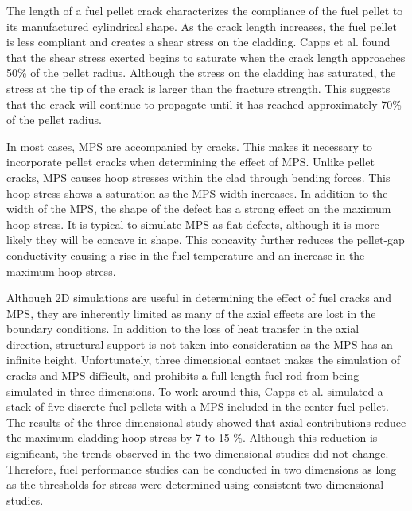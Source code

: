 \documentclass[edeposit,fullpage,11pt]{uiucthesis2009}
\begin{document}
The length of a fuel pellet crack characterizes the compliance of the fuel pellet to its manufactured cylindrical shape.
As the crack length increases, the fuel pellet is less compliant and creates a shear stress on the cladding.
Capps et al. found that the shear stress exerted begins to saturate when the crack length approaches 50\% of the pellet radius.
Although the stress on the cladding has saturated, the stress at the tip of the crack is larger than the fracture strength.
This suggests that the crack will continue to propagate until it has reached approximately 70\% of the pellet radius.

In most cases, \gls{MPS} are accompanied by cracks.
This makes it necessary to incorporate pellet cracks when determining the effect of \gls{MPS}.
Unlike pellet cracks, \gls{MPS} causes hoop stresses within the clad through bending forces.
This hoop stress shows a saturation as the \gls{MPS} width increases.
In addition to the width of the \gls{MPS}, the shape of the defect has a strong effect on the maximum hoop stress.
It is typical to simulate \gls{MPS} as flat defects, although it is more likely they will be concave in shape. 
This concavity further reduces the pellet-gap conductivity causing a rise in the fuel temperature and an increase in the maximum hoop stress.

Although 2D simulations are useful in determining the effect of fuel cracks and \gls{MPS}, they are inherently limited as many of the axial effects are lost in the boundary conditions.
In addition to the loss of heat transfer in the axial direction, structural support is not taken into consideration as the \gls{MPS} has an infinite height.
Unfortunately, three dimensional contact makes the simulation of cracks and \gls{MPS} difficult, and prohibits a full length fuel rod from being simulated in three dimensions. 
To work around this, Capps et al. simulated a stack of five discrete fuel pellets with a \gls{MPS} included in the center fuel pellet.
The results of the three dimensional study showed that axial contributions reduce the maximum cladding hoop stress by 7 to 15 \%.
Although this reduction is significant, the trends observed in the two dimensional studies did not change.
Therefore, fuel performance studies can be conducted in two dimensions as long as the thresholds for stress were determined using consistent two dimensional studies.
\end{document}
